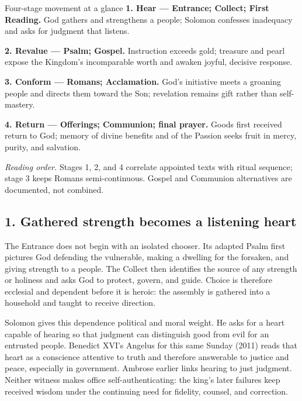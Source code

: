 \begin{deepstudy}
{\begin{studybox}{Four-stage movement at a glance}
\textbf{1. Hear --- Entrance; Collect; First Reading.} God gathers and strengthens a people; Solomon confesses inadequacy and asks for judgment that listens.

\textbf{2. Revalue --- Psalm; Gospel.} Instruction exceeds gold; treasure and pearl expose the Kingdom's incomparable worth and awaken joyful, decisive response.

\textbf{3. Conform --- Romans; Acclamation.} God's initiative meets a groaning people and directs them toward the Son; revelation remains gift rather than self-mastery.

\textbf{4. Return --- Offerings; Communion; final prayer.} Goods first received return to God; memory of divine benefits and of the Passion seeks fruit in mercy, purity, and salvation.
\end{studybox}

\noindent\emph{Reading order.} Stages 1, 2, and 4 correlate appointed texts with ritual sequence; stage 3 keeps Romans semi-continuous. Gospel and Communion alternatives are documented, not combined.

\subsection*{1. Gathered strength becomes a listening heart\enspace{}}

The Entrance does not begin with an isolated chooser. Its adapted Psalm first pictures God defending the vulnerable, making a dwelling for the forsaken, and giving strength to a people. The Collect then identifies the source of any strength or holiness and asks God to protect, govern, and guide. Choice is therefore ecclesial and dependent before it is heroic: the assembly is gathered into a household and taught to receive direction.

Solomon gives this dependence political and moral weight. He asks for a heart capable of hearing so that judgment can distinguish good from evil for an entrusted people. Benedict XVI's Angelus for this same Sunday (2011) reads that heart as a conscience attentive to truth and therefore answerable to justice and peace, especially in government. Ambrose earlier links hearing to just judgment. Neither witness makes office self-authenticating: the king's later failures keep received wisdom under the continuing need for fidelity, counsel, and correction.

}
\end{deepstudy}
